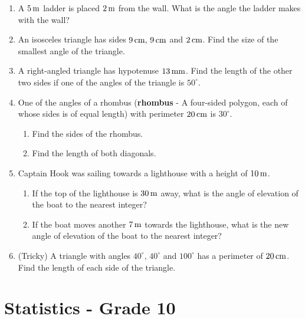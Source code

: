 \documentclass[10pt,a4paper,titlepage,twoside,openright]{report}
\begin{document}
\begin{enumerate}
  \item A $5\, \rm{m}$ ladder is placed $2\, \rm{m}$ from the wall. What is the angle the ladder makes with the wall? \\ \item An isosceles triangle has sides $9\, \rm{cm}, \, 9\, \rm{cm}$ and $2\, \rm{cm}$. Find the size of the smallest angle of the triangle.\\ \item A right-angled triangle has hypotenuse $13\,\rm{mm}$. Find the length of the other two sides if one of the angles of the triangle is $50^{\circ}$.\\ \item One of the angles of a rhombus (\textbf{rhombus} - A four-sided polygon, each of whose sides is of equal length) with perimeter $20\,\rm{cm}$ is $30^{\circ}$. \begin{enumerate} \item Find the sides of the rhombus. \\ \item Find the length of both diagonals. \\ \end{enumerate} \item Captain Hook was sailing towards a lighthouse with a height of $10\,\rm{m}$. \begin{enumerate} \item If the top of the lighthouse is $30\,\rm{m}$ away, what is the angle of elevation of the boat to the nearest integer?\\ \item If the boat moves another $7\,\rm{m}$ towards the lighthouse, what is the new angle of elevation of the boat to the nearest integer? \\ \end{enumerate} \item (Tricky) A triangle with angles $40^{\circ}, \, 40^{\circ}$ and $100^{\circ}$ has a perimeter of $20\, \rm{cm}$. Find the length of each side of the triangle. 



\end{enumerate}












\chapter{Statistics - Grade 10}
\label{m:s10}
\end{document}
